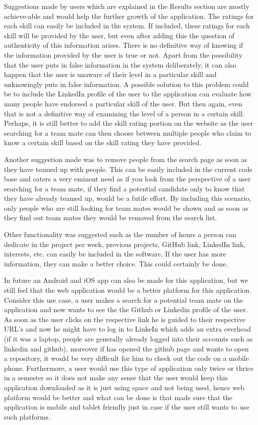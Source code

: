 \documentclass[conference]{IEEEtran}
\begin{document}
Suggestions made by users which are explained in the Results section are mostly achieve-able and would help the further growth of the application. The ratings for each skill can easily be included in the system. If included, these ratings for each skill will be provided by the user, but even after adding this the question of authenticity of this information arises. There is no definitive way of knowing if the information provided by the user is true or not. Apart from the possibility that the user puts in false information in the system deliberately, it can also happen that the user is unaware of their level in a particular skill and unknowingly puts in false information. A possible solution to this problem could be to include the LinkedIn profile of the user to the application can evaluate how many people have endorsed a particular skill of the user. But then again, even that is not a definitive way of examining the level of a person in a certain skill. Perhaps, it is still better to add the skill rating portion on the website as the user searching for a team mate can then choose between multiple people who claim to know a certain skill based on the skill rating they have provided. 

Another suggestion made was to remove people from the search page as soon as they have teamed up with people. This can be easily included in the current code base and caters a very eminent need as if you look from the perspective of a user searching for a team mate, if they find a potential candidate only to know that they have already teamed up, would be a futile effort. By including this scenario, only people who are still looking for team mates would be shown and as soon as they find out team mates they would be removed from the search list.

Other functionality was suggested such as the number of hours a person can dedicate in the project per week, previous projects, GitHub link, LinkedIn link, interests, etc. can easily be included in the software. If the user has more information, they can make a better choice. This could certainly be done.

In future an Android and iOS app can also be made for this application, but we still feel that the web application would be a better platform for this application. Consider this use case, a user makes a search for a potential team mate on the application and now wants to see the the Github or Linkedin profile of the user. As soon as the user clicks on the respective link he is guided to their respective URL's and now he might have to log in to LinkeIn which adds an extra overhead (if it was a laptop, people are generally already logged into their accounts such as linkedin and github), moreover if has opened the github page and wants to open a repository, it would be very difficult for him to check out the code on a mobile phone. Furthermore, a user would use this type of application only twice or thrice in a semester so it does not make any sense that the user would keep this application downloaded as it is just using space and not being used, hence web platform would be better and what can be done is that made sure that the application is mobile and tablet friendly just in case if the user still wants to use such platforms.
\end{document}
